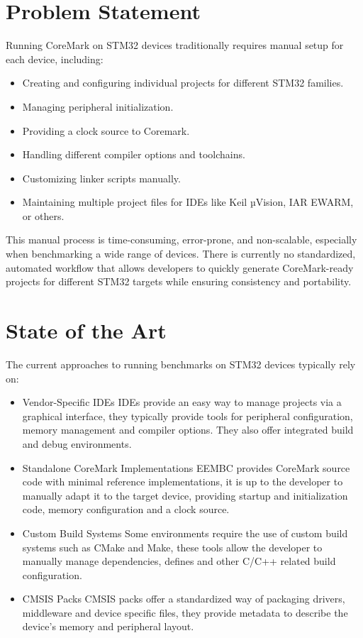 \section{Problem Statement}
Running CoreMark on STM32 devices traditionally requires manual setup for each device, including:
\begin{itemize}
	\item Creating and configuring individual projects for different STM32 families.
	\item Managing peripheral initialization.
	\item Providing a clock source to Coremark.
	\item Handling different compiler options and toolchains.
	\item Customizing linker scripts manually.
	\item Maintaining multiple project files for IDEs like Keil µVision, IAR EWARM, or others.
\end{itemize}
This manual process is time-consuming, error-prone, and non-scalable, especially when benchmarking a wide range of devices.
There is currently no standardized, automated workflow that allows developers to quickly generate CoreMark-ready projects for different STM32 targets while ensuring consistency and portability.

\section{State of the Art}
The current approaches to running benchmarks on STM32 devices typically rely on:
\begin{itemize}
	\item Vendor-Specific IDEs
		IDEs provide an easy way to manage projects via a graphical interface, they typically provide tools for peripheral configuration, memory management and compiler options.
		They also offer integrated build and debug environments.
	\item Standalone CoreMark Implementations
		EEMBC provides CoreMark source code with minimal reference implementations, it is up to the developer to manually adapt it to the target device, providing startup and initialization code, memory configuration and a clock source.
	\item Custom Build Systems
		Some environments require the use of custom build systems such as CMake and Make, these tools allow the developer to manually manage dependencies, defines and other C/C++ related build configuration.
	\item CMSIS Packs
		CMSIS packs offer a standardized way of packaging drivers, middleware and device specific files, they provide metadata to describe the device's memory and peripheral layout.
\end{itemize}
